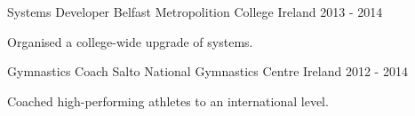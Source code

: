 \begin{cventries}
      \cventry
    {Systems Developer} %
    {Belfast Metropolition College} %
    {Ireland} %
    {2013 - 2014} %
        {  \begin{cvitems} %
        \item {Organised a college-wide upgrade of systems.}
      \end{cvitems}  
      }

      \cventry
    {Gymnastics Coach} %
    {Salto National Gymnastics Centre} %
    {Ireland} %
    {2012 - 2014 } %
    {  \begin{cvitems} %
        \item {Coached high-performing athletes to an international level.}
      \end{cvitems}  
      }


\end{cventries}
